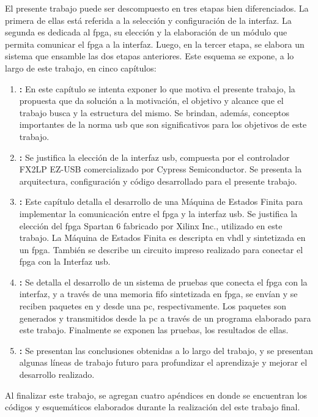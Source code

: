 El presente trabajo puede ser descompuesto en tres etapas bien diferenciados. La primera de ellas está referida a la selección y configuración de la interfaz. La segunda es dedicada al \acrshort{fpga}, su elección y la elaboración de un módulo que permita comunicar el \acrshort{fpga} a la interfaz. Luego, en la tercer etapa, se elabora un sistema que ensamble las dos etapas anteriores.
Este esquema se expone, a lo largo de este trabajo, en cinco capítulos:

\begin{enumerate}
	\item {\textbf{:}} En este capítulo se intenta exponer lo que motiva el presente trabajo, la propuesta que da solución a la motivación, el objetivo y alcance que el trabajo busca y la estructura del mismo. Se brindan, además, conceptos importantes de la norma \acrshort{usb} que son significativos para los objetivos de este trabajo.
	\item \textbf{:} Se justifica la elección de la interfaz \acrshort{usb}, compuesta por el controlador FX2LP EZ-USB comercializado por Cypress Semiconductor. Se presenta la arquitectura, configuración y código desarrollado para el presente trabajo. 
	\item \textbf{:} Este capítulo detalla el desarrollo de una Máquina de Estados Finita para implementar la comunicación entre el \acrshort{fpga} y la interfaz \acrshort{usb}. Se justifica la elección del \acrshort{fpga} Spartan 6 fabricado por Xilinx Inc., utilizado en este trabajo. La Máquina de Estados Finita es descripta en \acrshort{vhdl} y sintetizada en un \acrshort{fpga}. También se describe un circuito impreso realizado para conectar el \acrshort{fpga} con la Interfaz \acrshort{usb}.
	\item \textbf{:} Se detalla el desarrollo de un sistema de pruebas que conecta el \acrshort{fpga} con la interfaz, y a través de una memoria \acrshort{fifo} sintetizada en \acrshort{fpga}, se envían y se reciben paquetes en y desde una \acrshort{pc}, respectivamente. Los paquetes son generados y transmitidos desde la \acrshort{pc} a través de un programa elaborado para este trabajo. Finalmente se exponen las pruebas, los resultados de ellas.
	\item \textbf{:} Se presentan las conclusiones obtenidas a lo  largo del trabajo, y se presentan algunas líneas de trabajo futuro para profundizar el aprendizaje y mejorar el desarrollo realizado.
\end{enumerate}

	Al finalizar este trabajo, se agregan cuatro apéndices en donde se encuentran los códigos y esquemáticos elaborados durante la realización del este trabajo final.